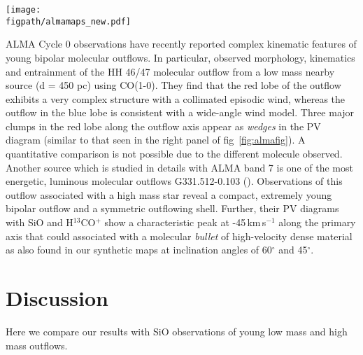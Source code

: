\documentclass[useAMS,usenatbib]{mn2e}
\newcommand{\figpath}{/Users/bhargavvaidya/MyProject/work/Leeds_Uni/SiOJets_New/PAPER/PFIGS/}
\begin{document}
\begin{figure*}
 \texttt{[image: \\figpath/almamaps\_new.pdf]}%
 \caption{{\bf Left:} The integrated intensity map of SiO(2-1), (5-4)
   and (8-7). The emission map shows the 5-4 line intensity (in units of Jy$\,$kms$^{-1}$/beam), the blue contours show the J=8-7 line intensity and the green contours show the J=2-1 line intensity. {\bf Right:} The PV diagram taken along the axis of the jet (in units of Jy/beam), showing the higher J transitions highlighting the knots of the jet and broad emission at the bow shock. In both panels the ticks on the color bar represent the contour levels.}
\label{fig:almafig}
\end{figure*} 

ALMA Cycle 0 observations have recently reported complex kinematic
features of young bipolar molecular outflows. In particular,
\cite{Arce:2013p14902} observed morphology, kinematics and entrainment 
of the HH 46/47 molecular outflow from a low mass nearby
source (d = 450 pc) using CO(1-0). They find that the red
lobe of the outflow exhibits a very complex structure with a
collimated episodic wind, whereas the outflow in the blue lobe is
consistent with a
wide-angle wind model. Three major clumps in the red lobe along the
outflow axis appear as {\em{wedges}} in the PV
diagram (similar to that seen in the right panel of fig~\ref{fig:almafig}). 
A quantitative comparison is not possible due to the different
molecule observed. Another source which is studied in details with ALMA band 7 is
one of the most energetic, luminous molecular outflows
G331.512-0.103 (\citealt{Merello:2013p15066}). Observations of this outflow
associated with a high mass star reveal a compact, extremely young
bipolar outflow and a symmetric outflowing shell. Further, their PV
diagrams with SiO and H$^{13}$CO$^{+}$ show a characteristic peak at
-45\,km\,s$^{-1}$ along the primary axis that could associated with a 
molecular {\em bullet} of high-velocity dense material as also found in our
synthetic maps at inclination angles of 60$^{\circ}$ and 45$^{\circ}$.

 
\section{Discussion}
\label{sec:discussion}
Here we compare our results with SiO observations of young low
mass and high mass outflows.
\end{document}
